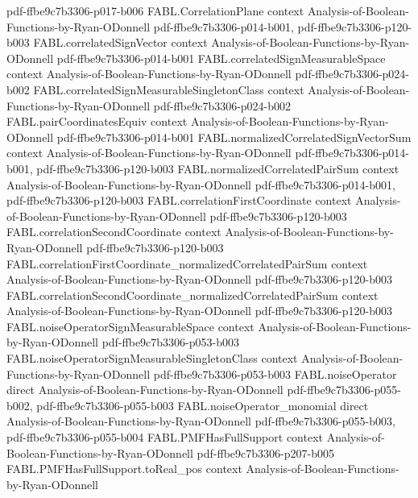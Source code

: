 \begin{theorem}
  {pdf-ffbe9c7b3306-p017-b006}
\proofstep
  {FABL.CorrelationPlane}
  {context}
  {Analysis-of-Boolean-Functions-by-Ryan-ODonnell}
  {pdf-ffbe9c7b3306-p014-b001,
    pdf-ffbe9c7b3306-p120-b003}
\proofstep
  {FABL.correlatedSignVector}
  {context}
  {Analysis-of-Boolean-Functions-by-Ryan-ODonnell}
  {pdf-ffbe9c7b3306-p014-b001}
\proofstep
  {FABL.correlatedSignMeasurableSpace}
  {context}
  {Analysis-of-Boolean-Functions-by-Ryan-ODonnell}
  {pdf-ffbe9c7b3306-p024-b002}
\proofstep
  {FABL.correlatedSignMeasurableSingletonClass}
  {context}
  {Analysis-of-Boolean-Functions-by-Ryan-ODonnell}
  {pdf-ffbe9c7b3306-p024-b002}
\proofstep
  {FABL.pairCoordinatesEquiv}
  {context}
  {Analysis-of-Boolean-Functions-by-Ryan-ODonnell}
  {pdf-ffbe9c7b3306-p014-b001}
\proofstep
  {FABL.normalizedCorrelatedSignVectorSum}
  {context}
  {Analysis-of-Boolean-Functions-by-Ryan-ODonnell}
  {pdf-ffbe9c7b3306-p014-b001,
    pdf-ffbe9c7b3306-p120-b003}
\proofstep
  {FABL.normalizedCorrelatedPairSum}
  {context}
  {Analysis-of-Boolean-Functions-by-Ryan-ODonnell}
  {pdf-ffbe9c7b3306-p014-b001,
    pdf-ffbe9c7b3306-p120-b003}
\proofstep
  {FABL.correlationFirstCoordinate}
  {context}
  {Analysis-of-Boolean-Functions-by-Ryan-ODonnell}
  {pdf-ffbe9c7b3306-p120-b003}
\proofstep
  {FABL.correlationSecondCoordinate}
  {context}
  {Analysis-of-Boolean-Functions-by-Ryan-ODonnell}
  {pdf-ffbe9c7b3306-p120-b003}
\proofstep
  {FABL.correlationFirstCoordinate_normalizedCorrelatedPairSum}
  {context}
  {Analysis-of-Boolean-Functions-by-Ryan-ODonnell}
  {pdf-ffbe9c7b3306-p120-b003}
\proofstep
  {FABL.correlationSecondCoordinate_normalizedCorrelatedPairSum}
  {context}
  {Analysis-of-Boolean-Functions-by-Ryan-ODonnell}
  {pdf-ffbe9c7b3306-p120-b003}
\proofstep
  {FABL.noiseOperatorSignMeasurableSpace}
  {context}
  {Analysis-of-Boolean-Functions-by-Ryan-ODonnell}
  {pdf-ffbe9c7b3306-p053-b003}
\proofstep
  {FABL.noiseOperatorSignMeasurableSingletonClass}
  {context}
  {Analysis-of-Boolean-Functions-by-Ryan-ODonnell}
  {pdf-ffbe9c7b3306-p053-b003}
\proofstep
  {FABL.noiseOperator}
  {direct}
  {Analysis-of-Boolean-Functions-by-Ryan-ODonnell}
  {pdf-ffbe9c7b3306-p055-b002,
    pdf-ffbe9c7b3306-p055-b003}
\proofstep
  {FABL.noiseOperator_monomial}
  {direct}
  {Analysis-of-Boolean-Functions-by-Ryan-ODonnell}
  {pdf-ffbe9c7b3306-p055-b003,
    pdf-ffbe9c7b3306-p055-b004}
\proofstep
  {FABL.PMFHasFullSupport}
  {context}
  {Analysis-of-Boolean-Functions-by-Ryan-ODonnell}
  {pdf-ffbe9c7b3306-p207-b005}
\proofstep
  {FABL.PMFHasFullSupport.toReal_pos}
  {context}
  {Analysis-of-Boolean-Functions-by-Ryan-ODonnell}

\end{theorem}
